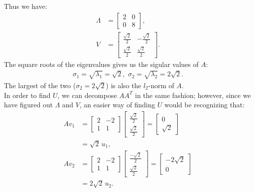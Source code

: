\documentclass[11pt]{article}
\begin{document}
Thus we have:
\begin{equation}\begin{split} \Lambda&=\begin{bmatrix} 2 & 0\\ 0 & 8\end{bmatrix}, \\
V&=\begin{bmatrix} \frac{\sqrt{2}}2 & -\frac{\sqrt{2}}2 \\ \frac{\sqrt{2}}2 & \frac{\sqrt{2}}2\end{bmatrix}.
\end{split}\nonumber\end{equation} 
The square roots of the eigenvalues gives us the sigular values of $A$: 
\begin{equation}\begin{split} \sigma_1=\sqrt{\lambda_1}=\sqrt{2},\,\,\sigma_2=\sqrt{\lambda_2} = 2\sqrt{2}.\end{split}\nonumber\end{equation}
The largest of the two ($\sigma_2=2 \sqrt{2}$) is also the $l_2$-norm of $A$.\\[0.3cm]
In order to find $U$, we can decompose $AA^T$ in the same fashion; however, since we have figured out $\Lambda$ and $V$, an easier way of finding $U$ would be recognizing that:
\begin{equation}\begin{split} 
Av_1 &= \begin{bmatrix} 2 & -2 \\ 1 & 1\end{bmatrix}\begin{bmatrix} \frac{\sqrt{2}}2 \\ \frac{\sqrt{2}}2\end{bmatrix} = \begin{bmatrix} 0 \\ \sqrt{2}\end{bmatrix}\\
&=\sqrt{2}\,u_1,\\
Av_2 &= \begin{bmatrix} 2 & -2 \\ 1 & 1\end{bmatrix}\begin{bmatrix} \frac{-\sqrt{2}}2 \\ \frac{\sqrt{2}}2\end{bmatrix} = \begin{bmatrix}-2\sqrt{2}\\0\end{bmatrix}\\
&=2\sqrt{2}\,u_2.
\end{split}\nonumber\end{equation} 
\end{document}
